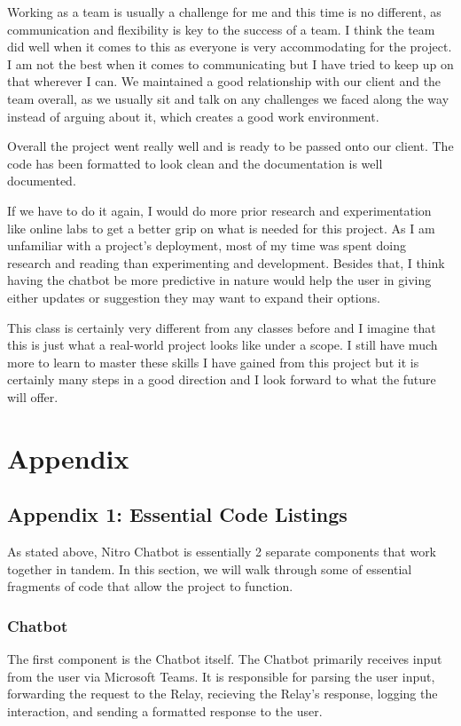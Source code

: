 \documentclass[onecolumn, draftclsnofoot,10pt, compsoc]{IEEEtran}
\begin{document}
    Working as a team is usually a challenge for me and this time is no different, as communication and flexibility is key to the success of a team.
    I think the team did well when it comes to this as everyone is very accommodating for the project.
    I am not the best when it comes to communicating but I have tried to keep up on that wherever I can.
    We maintained a good relationship with our client and the team overall, as we usually sit and talk on any challenges we faced along the way instead of arguing about it, which creates a good work environment.
    
    Overall the project went really well and is ready to be passed onto our client.
    The code has been formatted to look clean and the documentation is well documented.
    
    If we have to do it again, I would do more prior research and experimentation like online labs to get a better grip on what is needed for this project.
    As I am unfamiliar with a project's deployment, most of my time was spent doing research and reading than experimenting and development.
    Besides that, I think having the chatbot be more predictive in nature would help the user in giving either updates or suggestion they may want to expand their options.
    
    This class is certainly very different from any classes before and I imagine that this is just what a real-world project looks like under a scope.
    I still have much more to learn to master these skills I have gained from this project but it is certainly many steps in a good direction and I look forward to what the future will offer.

\section{Appendix}
\subsection{Appendix 1: Essential Code Listings}
As stated above, Nitro Chatbot is essentially 2 separate components that work together in tandem.
In this section, we will walk through some of essential fragments of code that allow the project to function.

\subsubsection{Chatbot}
The first component is the Chatbot itself.
The Chatbot primarily receives input from the user via Microsoft Teams.
It is responsible for parsing the user input, forwarding the request to the Relay, recieving the Relay's response, logging the interaction, and sending a formatted response to the user.
\end{document}
